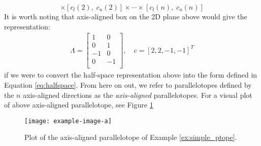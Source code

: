 \begin{example}
\begin{equation}
[c_l(1), \;c_u(1)] \times [c_l(2),\; c_u(2)] \times \cdots \times [c_l(n), \; c_u(n)]
\end{equation}
%
It is worth noting that axis-aligned box on the 2D plane above would give the representation:
\begin{align}
  \Lambda = \begin{bmatrix}
            1 & 0 \\
            0 & 1 \\
            -1 & 0 \\
            0 & -1 \\
            \end{bmatrix} , \quad c = [2,2,-1,-1]^T
\end{align}
if we were to convert the half-space representation above into the form defined in Equation \ref{eq:halfspace}.
%
From here on out, we refer to parallelotopes defined by the $n$ axis-aligned directions as the \emph{axis-aligned} parallelotopes.
%
For a visual plot of above axis-aligned parallelotope, see Figure \ref{fig:axis_align_ptope}

\begin{figure}
  \centering
  \texttt{[image: example-image-a]}
  \caption{Plot of the axis-aligned parallelotope of Example \ref{ex:simple_ptope}.}
  \label{fig:axis_align_ptope}
\end{figure}

\end{example}

